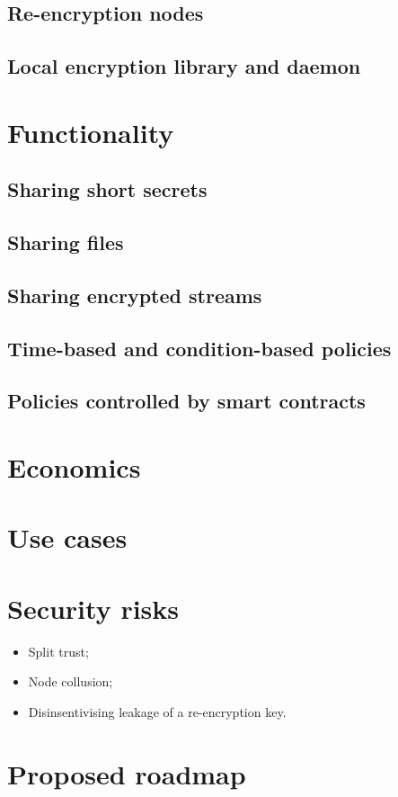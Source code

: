 \documentclass[notitlepage,longbibliography]{revtex4-1}
\begin{document}
\subsection{Re-encryption nodes}

\subsection{Local encryption library and daemon}

\section{Functionality}

\subsection{Sharing short secrets}

\subsection{Sharing files}

\subsection{Sharing encrypted streams}

\subsection{Time-based and condition-based policies}

\subsection{Policies controlled by smart contracts}

\section{Economics}

\section{Use cases}

\section{Security risks}

\begin{itemize}
    \item Split trust;
    \item Node collusion;
    \item Disinsentivising leakage of a re-encryption key.
\end{itemize}

\section{Proposed roadmap}


\end{document}
